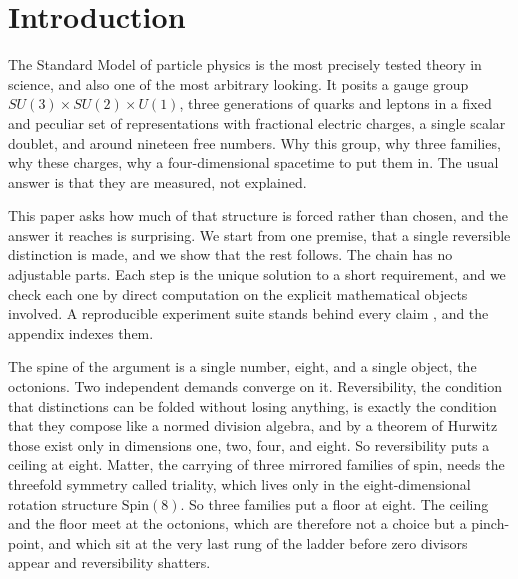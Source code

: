 \section{Introduction}

The Standard Model of particle physics is the most precisely tested theory in science, and also one of the most
arbitrary looking. It posits a gauge group $SU(3)\times SU(2)\times U(1)$, three generations of quarks and leptons in
a fixed and peculiar set of representations with fractional electric charges, a single scalar doublet, and around
nineteen free numbers. Why this group, why three families, why these charges, why a four-dimensional spacetime to put
them in. The usual answer is that they are measured, not explained.

This paper asks how much of that structure is forced rather than chosen, and the answer it reaches is surprising. We
start from one premise, that a single reversible distinction is made, and we show that the rest follows. The chain has
no adjustable parts. Each step is the unique solution to a short requirement, and we check each one by direct
computation on the explicit mathematical objects involved. A reproducible experiment suite stands behind every claim
\cite{cluesurf2026repo}, and the appendix indexes them.

The spine of the argument is a single number, eight, and a single object, the octonions. Two independent demands
converge on it. Reversibility, the condition that distinctions can be folded without losing anything, is exactly the
condition that they compose like a normed division algebra, and by a theorem of Hurwitz \cite{baez2002octonions} those exist
only in dimensions one, two, four, and eight. So reversibility puts a ceiling at eight. Matter, the carrying of three
mirrored families of spin, needs the threefold symmetry called triality, which lives only in the eight-dimensional
rotation structure $\mathrm{Spin}(8)$. So three families put a floor at eight. The ceiling and the floor meet at the
octonions, which are therefore not a choice but a pinch-point, and which sit at the very last rung of the ladder before
zero divisors appear and reversibility shatters.

